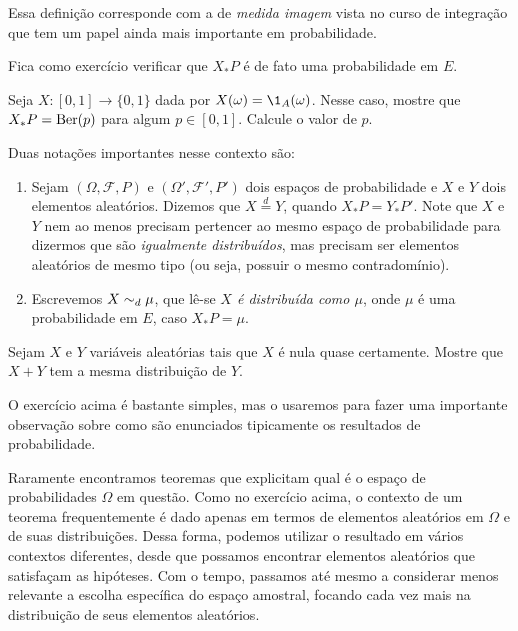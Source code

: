 \begin{remark}
 Essa definição corresponde com a de \textit{medida imagem} vista no curso de integração que tem um papel ainda mais importante em probabilidade.
 \end{remark}



Fica como exercício verificar que $X_*P$ é de fato uma probabilidade em $E$.

\begin{exercise}
  Seja $X:[0,1] \to \{0,1\}$ dada por $X(\omega) = \1_A (\omega)$.
  Nesse caso, mostre que $X_*P = \operatorname{Ber}(p)$ para algum $p \in [0,1]$.
  Calcule o valor de $p$.
\end{exercise}

Duas notações importantes nesse contexto são:
\begin{enumerate}[\quad a)]
\item Sejam $(\Omega, \mathcal{F}, P)$ e $(\Omega',\mathcal{F}',P')$ dois espaços de probabilidade e $X$ e $Y$ dois elementos aleatórios.
Dizemos que $X \stackrel{d}{=} Y$,  quando $X_*P = Y_*P'$.
Note que $X$ e $Y$ nem ao menos precisam pertencer ao mesmo espaço de probabilidade para dizermos que são \emph{igualmente distribuídos}, mas precisam ser elementos aleatórios de mesmo tipo (ou seja, possuir o mesmo contradomínio).
\item Escrevemos $X \sim_d \mu$,  que lê-se \emph{$X$ é distribuída como $\mu$}, onde $\mu$ é uma probabilidade em $E$, caso $X_*P = \mu$.
\end{enumerate}

\begin{exercise}
  Sejam $X$ e $Y$ variáveis aleatórias tais que $X$ é nula quase certamente.
  Mostre que $X + Y$ tem a mesma distribuição de $Y$.
\end{exercise}

O exercício acima é bastante simples, mas o usaremos para fazer uma importante observação sobre como são enunciados tipicamente os resultados de probabilidade.

Raramente encontramos teoremas que explicitam qual é o espaço de probabilidades $\Omega$ em questão.
Como no exercício acima, o contexto de um teorema frequentemente é dado apenas em termos de elementos aleatórios em $\Omega$ e de suas distribuições.
Dessa forma, podemos utilizar o resultado em vários contextos diferentes, desde que possamos encontrar elementos aleatórios que satisfaçam as hipóteses.
Com o tempo, passamos até mesmo a considerar menos relevante a escolha específica do espaço amostral, focando cada vez mais na distribuição de seus elementos aleatórios.

